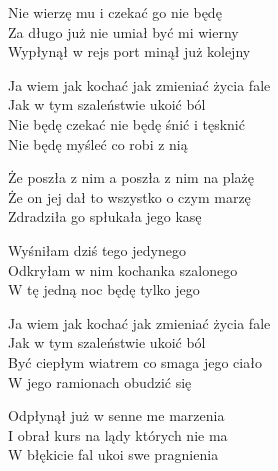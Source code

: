 \begin{text}
    Nie wierzę mu i czekać go nie będę\\
    Za długo już nie umiał być mi wierny\\
    Wypłynął w rejs port minął już kolejny

    \vin Ja wiem jak kochać jak zmieniać życia fale\\
    \vin Jak w tym szaleństwie ukoić ból\\
    \vin Nie będę czekać nie będę śnić i tęsknić\\
    \vin Nie będę myśleć co robi z nią

    Że poszła z nim a poszła z nim na plażę\\
    Że on jej dał to wszystko o czym marzę\\
    Zdradziła go spłukała jego kasę

    Wyśniłam dziś tego jedynego\\
    Odkryłam w nim kochanka szalonego\\
    W tę jedną noc będę tylko jego

    \vin Ja wiem jak kochać jak zmieniać życia fale\\
    \vin Jak w tym szaleństwie ukoić ból\\
    \vin Być ciepłym wiatrem co smaga jego ciało\\
    \vin W jego ramionach obudzić się

    Odpłynął już w senne me marzenia\\
    I obrał kurs na lądy których nie ma\\
    W błękicie fal ukoi swe pragnienia
\end{text}
\begin{chord}

\end{chord}